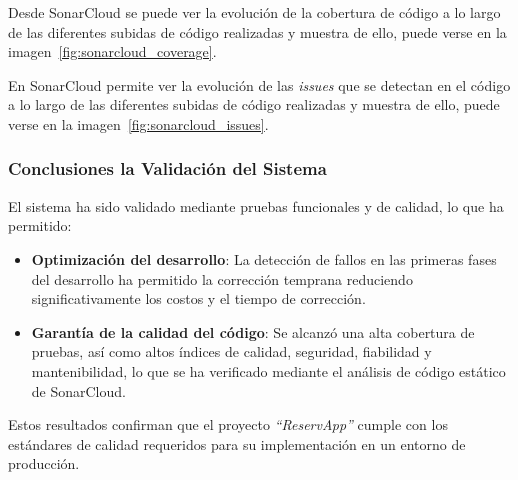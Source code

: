 

Desde SonarCloud se puede ver la evolución de la cobertura de código a lo largo de las diferentes subidas de código realizadas y muestra de ello, puede verse en la imagen~\ref{fig:sonarcloud_coverage}.


En SonarCloud permite ver la evolución de las \emph{issues} que se detectan en el código a lo largo de las diferentes subidas de código realizadas y muestra de ello, puede verse en la imagen~\ref{fig:sonarcloud_issues}.


\subsubsection{Conclusiones la Validación del Sistema}
El sistema ha sido validado mediante pruebas funcionales y de calidad, lo que ha permitido:
\begin{itemize}
   \item \textbf{Optimización del desarrollo}: La detección de fallos en las primeras fases del desarrollo ha permitido la corrección temprana reduciendo significativamente los costos y el tiempo de corrección.
   \item \textbf{Garantía de la calidad del código}: Se alcanzó una alta cobertura de pruebas, así como altos índices de calidad, seguridad, fiabilidad y mantenibilidad, lo que se ha verificado mediante el análisis de código estático de SonarCloud.
\end{itemize}

Estos resultados confirman que el proyecto \textit{``ReservApp''} cumple con los estándares de calidad requeridos para su implementación en un entorno de producción.